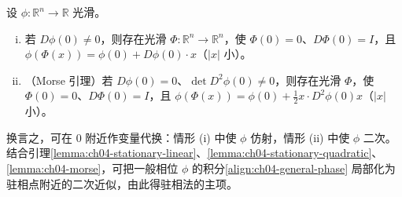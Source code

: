\documentclass[../../main.tex]{subfiles}
\begin{document}
\begin{lemma}[坐标变换]\label{lemma:ch04-morse}设 $\phi:\mathbb{R}^n\to\mathbb{R}$ 光滑。
\begin{enumerate}[(i)]
\item 若 $D\phi(0)\neq 0$，则存在光滑 $\Phi:\mathbb{R}^n\to\mathbb{R}^n$，使 $\Phi(0)=0$、$D\Phi(0)=I$，且 $\phi(\Phi(x))=\phi(0)+D\phi(0)\cdot x$（$|x|$ 小）。
\item（Morse 引理）若 $D\phi(0)=0$、$\det D^2\phi(0)\neq 0$，则存在光滑 $\Phi$，使 $\Phi(0)=0$、$D\Phi(0)=I$，且 $\phi(\Phi(x))=\phi(0)+\tfrac{1}{2}x\cdot D^2\phi(0)x$（$|x|$ 小）。
\end{enumerate}
\end{lemma}

换言之，可在 $0$ 附近作变量代换：情形 (i) 中使 $\phi$ 仿射，情形 (ii) 中使 $\phi$ 二次。结合引理\cref{lemma:ch04-stationary-linear}、\cref{lemma:ch04-stationary-quadratic}、\cref{lemma:ch04-morse}，可把一般相位 $\phi$ 的积分\eqref{align:ch04-general-phase} 局部化为驻相点附近的二次近似，由此得驻相法的主项。
\end{document}
